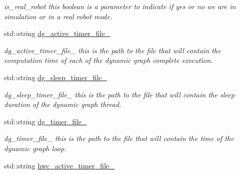 \begin{DoxyCompactItemize}
\begin{DoxyCompactList}\small\item\em is\+\_\+real\+\_\+robot this boolean is a parameter to indicate if yes or no we are in simulation or in a real robot mode. \end{DoxyCompactList}\item 
std\+::string \hyperlink{classdynamic__graph_1_1DynamicGraphManager_a18c2cc959dceef659ab1f567e06254f7}{dg\+\_\+active\+\_\+timer\+\_\+file\+\_\+}\hypertarget{classdynamic__graph_1_1DynamicGraphManager_a18c2cc959dceef659ab1f567e06254f7}{}\label{classdynamic__graph_1_1DynamicGraphManager_a18c2cc959dceef659ab1f567e06254f7}

\begin{DoxyCompactList}\small\item\em dg\+\_\+active\+\_\+timer\+\_\+file\+\_\+ this is the path to the file that will contain the computation time of each of the dynamic graph complete execution. \end{DoxyCompactList}\item 
std\+::string \hyperlink{classdynamic__graph_1_1DynamicGraphManager_af02dbc7fb67674937208abe4cd75d652}{dg\+\_\+sleep\+\_\+timer\+\_\+file\+\_\+}\hypertarget{classdynamic__graph_1_1DynamicGraphManager_af02dbc7fb67674937208abe4cd75d652}{}\label{classdynamic__graph_1_1DynamicGraphManager_af02dbc7fb67674937208abe4cd75d652}

\begin{DoxyCompactList}\small\item\em dg\+\_\+sleep\+\_\+timer\+\_\+file\+\_\+ this is the path to the file that will contain the sleep duration of the dynamic graph thread. \end{DoxyCompactList}\item 
std\+::string \hyperlink{classdynamic__graph_1_1DynamicGraphManager_a1a43bcf9c74648466d1e561203a39d87}{dg\+\_\+timer\+\_\+file\+\_\+}\hypertarget{classdynamic__graph_1_1DynamicGraphManager_a1a43bcf9c74648466d1e561203a39d87}{}\label{classdynamic__graph_1_1DynamicGraphManager_a1a43bcf9c74648466d1e561203a39d87}

\begin{DoxyCompactList}\small\item\em dg\+\_\+timer\+\_\+file\+\_\+ this is the path to the file that will contain the time of the dynamic graph loop. \end{DoxyCompactList}\item 
std\+::string \hyperlink{classdynamic__graph_1_1DynamicGraphManager_a2bd29dbd358b8c02805f4df970e75936}{hwc\+\_\+active\+\_\+timer\+\_\+file\+\_\+}\hypertarget{classdynamic__graph_1_1DynamicGraphManager_a2bd29dbd358b8c02805f4df970e75936}{}\label{classdynamic__graph_1_1DynamicGraphManager_a2bd29dbd358b8c02805f4df970e75936}


\end{DoxyCompactItemize}

